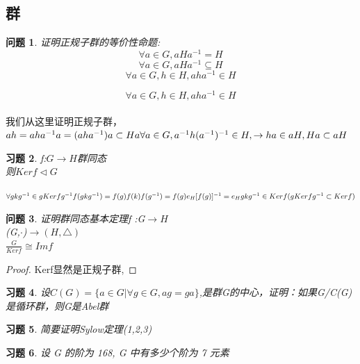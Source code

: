 \documentclass{report}
\newtheorem{proof}{证明}[section]
\newtheorem{exercise}{习题}[section]
\newtheorem{problem}[exercise]{问题}
\begin{document}
\subsection{群}
\begin{problem}
证明正规子群的等价性命题:
	$$\forall a \in G,aHa^{-1}=H$$
	$$\forall a \in G,aHa^{-1}\subseteq H$$
	$$\forall a \in G,h \in H,aha^{-1}\in H$$
\end{problem}
\begin{Hint}
$$\forall a \in G,h \in H,aha^{-1}\in H$$
\\ 我们从这里证明正规子群，
\textcolor{lightdark}{$ah=aha^{-1}a=(aha^{-1})a \subset Ha
\\ \forall a \in G ,a^{-1}h(a^{-1})^{-1} \in H ,\rightarrow ha \in aH,Ha \subset aH
$}
\end{Hint}
\begin{exercise}
f:$G \rightarrow H$群同态
\\ 则$ Kerf \triangleleft G$
\end{exercise}
\begin{Hint}
\textcolor{lightdark}{$\forall gkg^{-1} \in g Kerf g^{-1}
\\ f(gkg^{-1})=f(g)f(k)f(g^{-1})
\\ =f(g)e_{H}[f(g)]^{-1}=e_{H}
\\ gkg^{-1} \in Kerf(gKerfg^{-1}\subset Kerf)$}
\end{Hint}
\begin{problem}
证明群同态基本定理f :G$\rightarrow H$
\\(G,$\cdot$)$\rightarrow(H,\triangle)$
\\$\frac{G}{Kerf}\cong Imf$

\end{problem}
\begin{proof}
\textcolor{lightdark}{Kerf显然是正规子群,}
\end{proof}
\begin{exercise}
设$C(G)= \{ a \in G|\forall g \in G,ag=ga \} $,是群G的中心，证明：如果G/C(G)是循环群，则G是Abel群
\end{exercise}
\begin{exercise}
简要证明Sylow定理(1,2,3)
\end{exercise}
\begin{exercise}
设 G 的阶为 168, G 中有多少个阶为 7 元素
\end{exercise}
\end{document}
